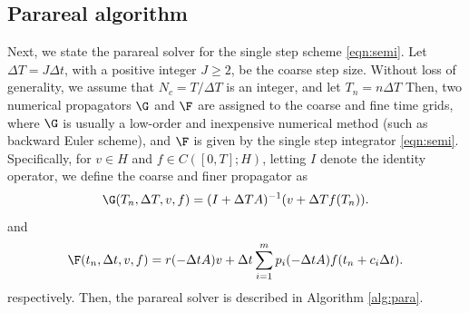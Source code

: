 








\subsection{Parareal algorithm}
Next, we state the parareal solver for the single step scheme \eqref{eqn:semi}.
Let $\Delta T=J \Delta t$, with a positive integer $J\ge2$, be the coarse step size.
Without loss of generality, we assume that $N_c = T/\Delta T$ is an integer, and let $T_n = n\Delta T$
Then, two numerical propagators $\G$ and $\F$ are assigned to the coarse and fine time grids,
where $\G$ is usually a low-order and inexpensive numerical method (such as backward Euler scheme), and $\F$
is given by the single step integrator \eqref{eqn:semi}. Specifically, for $v\in H$ and $f\in C([0,T];H)$, letting
$I$ denote the identity operator,
we define the coarse
and finer propagator as
\begin{equation*}
\G(T_n, \Delta T, v, f) = (I + \Delta T A)^{-1} (v + \Delta T f(T_n)).
\end{equation*}
and
\begin{equation*}
\F(t_n, \Delta t, v, f) =   r(-{\Delta t} A) v + {\Delta t} \sum_{i=1}^m p_i(-{\Delta t} A)  f(t_{n}+c_i\Delta t).
\end{equation*}
respectively. Then, the parareal solver is described in Algorithm \ref{alg:para}.


